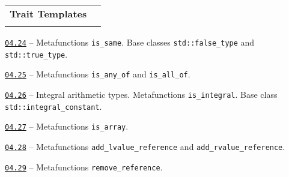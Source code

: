 \documentclass[a4paper,12pt]{article}
\renewenvironment{itemize}
{
    \begin{list}{\labelitemi}
    {
      \setlength{\topsep}{0pt}
      \setlength{\partopsep}{0pt}
      \setlength{\parskip}{0pt}
      \setlength{\itemsep}{0pt}
      \setlength{\parsep}{0pt}
      \setlength{\leftmargin}{14.5pt}
    }
}{\end{list}}
\begin{document}
\begin{tabular}{!{\vrule width 1pt}L{3.2cm}!{\vrule width 1pt}L{15.8cm}!{\vrule width 0pt}} 


\textbf{Trait Templates} & \\


\end{tabular}

\medskip\smallskip

\begin{itemize}

    \item \href{https://github.com/i-s-m-mipt/Education/blob/master/projects/examples/source/04.24.cpp}{\texttt{04.24}} -- Metafunctions \lstinline{is_same}. Base classes \lstinline{std::false_type} and \lstinline{std::true_type}.

    \smallskip

    \item \href{https://github.com/i-s-m-mipt/Education/blob/master/projects/examples/source/04.25.cpp}{\texttt{04.25}} -- Metafunctions \lstinline{is_any_of} and \lstinline{is_all_of}.

    \smallskip

    \item \href{https://github.com/i-s-m-mipt/Education/blob/master/projects/examples/source/04.26.cpp}{\texttt{04.26}} -- Integral arithmetic types. Metafunctions \lstinline{is_integral}. Base class \lstinline{std::integral_constant}.

    \smallskip

    \item \href{https://github.com/i-s-m-mipt/Education/blob/master/projects/examples/source/04.27.cpp}{\texttt{04.27}} -- Metafunctions \lstinline{is_array}.

    \smallskip

    \item \href{https://github.com/i-s-m-mipt/Education/blob/master/projects/examples/source/04.28.cpp}{\texttt{04.28}} -- Metafunctions \lstinline{add_lvalue_reference} and \lstinline{add_rvalue_reference}.

    \smallskip

    \item \href{https://github.com/i-s-m-mipt/Education/blob/master/projects/examples/source/04.29.cpp}{\texttt{04.29}} -- Metafunctions \lstinline{remove_reference}.


\end{itemize}
\end{document}
